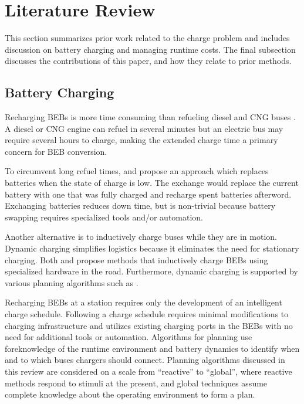 \section{Literature Review}
\par This section summarizes prior work related to the charge problem and includes discussion on battery charging and managing runtime costs. The final subsection discusses the contributions of this paper, and how they relate to prior methods.
\subsection{Battery Charging}
Recharging BEBs is more time consuming than refueling diesel and CNG buses \cite{wei_optimizing_2018}. A diesel or CNG engine can refuel in several minutes but an electric bus may require several hours to charge, making the extended charge time a primary concern for BEB conversion.
\par To circumvent long refuel times, \cite{xian_zhang_optimal_2016} and \cite{jain_battery_2020} propose an approach which replaces batteries when the state of charge is low. The exchange would replace the current battery with one that was fully charged and recharge spent batteries afterword. Exchanging batteries reduces down time, but is non-trivial because battery swapping requires specialized tools and/or automation.
\par Another alternative is to inductively charge buses while they are in motion. Dynamic charging simplifies logistics because it eliminates the need for stationary charging. Both \cite{balde_electric_2019} and \cite{jeong_automatic_2018} propose methods that inductively charge BEBs using specialized hardware in the road. Furthermore, dynamic charging is supported by various planning algorithms such as \cite{csonka_optimization_2021, Alwesabi_2021_Novel, Alwesabi_2022_Robust}.
\par Recharging BEBs at a station 
requires only the development of an intelligent charge schedule. Following a charge schedule requires minimal modifications to charging infrastructure and utilizes existing charging ports in the BEBs with no need for additional tools or automation. Algorithms for planning use foreknowledge of the runtime environment and battery dynamics to identify when and to which buses chargers should connect. Planning algorithms discussed in this review are considered on a scale from ``reactive'' to ``global'', where reactive methods respond to stimuli at the present, and global techniques assume complete knowledge about the operating environment to form a plan.
